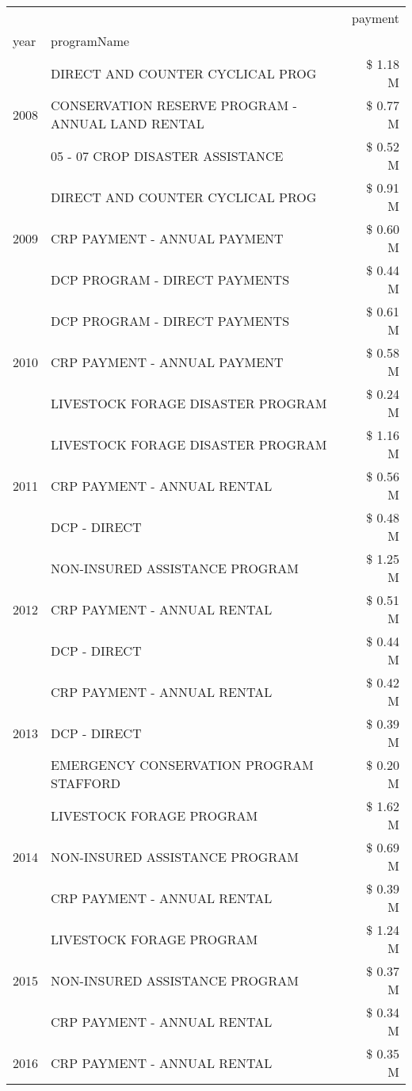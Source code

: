 \begin{tabular}{llr}
\toprule
 &  & payment \\
year & programName &  \\
\midrule
\multirow[t]{3}{*}{2008} & DIRECT AND COUNTER CYCLICAL PROG & \$ 1.18 M \\
 & CONSERVATION RESERVE PROGRAM - ANNUAL LAND RENTAL & \$ 0.77 M \\
 & 05 - 07 CROP DISASTER ASSISTANCE & \$ 0.52 M \\
\cline{1-3}
\multirow[t]{3}{*}{2009} & DIRECT AND COUNTER CYCLICAL PROG & \$ 0.91 M \\
 & CRP PAYMENT - ANNUAL PAYMENT & \$ 0.60 M \\
 & DCP PROGRAM - DIRECT PAYMENTS & \$ 0.44 M \\
\cline{1-3}
\multirow[t]{3}{*}{2010} & DCP PROGRAM - DIRECT PAYMENTS & \$ 0.61 M \\
 & CRP PAYMENT - ANNUAL PAYMENT & \$ 0.58 M \\
 & LIVESTOCK FORAGE DISASTER  PROGRAM & \$ 0.24 M \\
\cline{1-3}
\multirow[t]{3}{*}{2011} & LIVESTOCK FORAGE DISASTER PROGRAM & \$ 1.16 M \\
 & CRP PAYMENT - ANNUAL RENTAL & \$ 0.56 M \\
 & DCP - DIRECT & \$ 0.48 M \\
\cline{1-3}
\multirow[t]{3}{*}{2012} & NON-INSURED ASSISTANCE PROGRAM & \$ 1.25 M \\
 & CRP PAYMENT - ANNUAL RENTAL & \$ 0.51 M \\
 & DCP - DIRECT & \$ 0.44 M \\
\cline{1-3}
\multirow[t]{3}{*}{2013} & CRP PAYMENT - ANNUAL RENTAL & \$ 0.42 M \\
 & DCP - DIRECT & \$ 0.39 M \\
 & EMERGENCY CONSERVATION PROGRAM STAFFORD & \$ 0.20 M \\
\cline{1-3}
\multirow[t]{3}{*}{2014} & LIVESTOCK FORAGE PROGRAM & \$ 1.62 M \\
 & NON-INSURED ASSISTANCE PROGRAM & \$ 0.69 M \\
 & CRP PAYMENT - ANNUAL RENTAL & \$ 0.39 M \\
\cline{1-3}
\multirow[t]{3}{*}{2015} & LIVESTOCK FORAGE PROGRAM & \$ 1.24 M \\
 & NON-INSURED ASSISTANCE PROGRAM & \$ 0.37 M \\
 & CRP PAYMENT - ANNUAL RENTAL & \$ 0.34 M \\
\cline{1-3}
\multirow[t]{3}{*}{2016} & CRP PAYMENT - ANNUAL RENTAL & \$ 0.35 M \\

\end{tabular}
